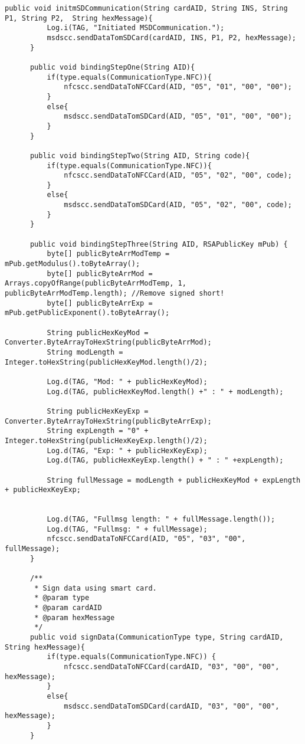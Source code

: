 \begin{lstlisting}[caption=CommunicationController.java.,breaklines=true,breakatwhitespace=false, label=lst:CommunicationController,escapechar=å]
      public void initmSDCommunication(String cardAID, String INS, String P1, String P2,  String hexMessage){
          Log.i(TAG, "Initiated MSDCommunication.");
          msdscc.sendDataTomSDCard(cardAID, INS, P1, P2, hexMessage);
      }

      public void bindingStepOne(String AID){
          if(type.equals(CommunicationType.NFC)){
              nfcscc.sendDataToNFCCard(AID, "05", "01", "00", "00");
          }
          else{
              msdscc.sendDataTomSDCard(AID, "05", "01", "00", "00");
          }
      }

      public void bindingStepTwo(String AID, String code){
          if(type.equals(CommunicationType.NFC)){
              nfcscc.sendDataToNFCCard(AID, "05", "02", "00", code);
          }
          else{
              msdscc.sendDataTomSDCard(AID, "05", "02", "00", code);
          }
      }

      public void bindingStepThree(String AID, RSAPublicKey mPub) {
          byte[] publicByteArrModTemp = mPub.getModulus().toByteArray();
          byte[] publicByteArrMod = Arrays.copyOfRange(publicByteArrModTemp, 1, publicByteArrModTemp.length); //Remove signed short!
          byte[] publicByteArrExp = mPub.getPublicExponent().toByteArray();

          String publicHexKeyMod = Converter.ByteArrayToHexString(publicByteArrMod);
          String modLength = Integer.toHexString(publicHexKeyMod.length()/2);

          Log.d(TAG, "Mod: " + publicHexKeyMod);
          Log.d(TAG, publicHexKeyMod.length() +" : " + modLength);

          String publicHexKeyExp = Converter.ByteArrayToHexString(publicByteArrExp);
          String expLength = "0" + Integer.toHexString(publicHexKeyExp.length()/2);
          Log.d(TAG, "Exp: " + publicHexKeyExp);
          Log.d(TAG, publicHexKeyExp.length() + " : " +expLength);

          String fullMessage = modLength + publicHexKeyMod + expLength + publicHexKeyExp;


          Log.d(TAG, "Fullmsg length: " + fullMessage.length());
          Log.d(TAG, "Fullmsg: " + fullMessage);
          nfcscc.sendDataToNFCCard(AID, "05", "03", "00", fullMessage);
      }

      /**
       * Sign data using smart card.
       * @param type
       * @param cardAID
       * @param hexMessage
       */
      public void signData(CommunicationType type, String cardAID, String hexMessage){
          if(type.equals(CommunicationType.NFC)) {
              nfcscc.sendDataToNFCCard(cardAID, "03", "00", "00", hexMessage);
          }
          else{
              msdscc.sendDataTomSDCard(cardAID, "03", "00", "00", hexMessage);
          }
      }


\end{lstlisting}
